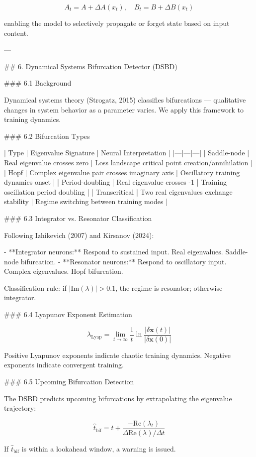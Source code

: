 \[
A_t = A + \Delta A(x_t), \quad B_t = B + \Delta B(x_t)
\]

enabling the model to selectively propagate or forget state based on input content.

---

## 6. Dynamical Systems Bifurcation Detector (DSBD)

### 6.1 Background

Dynamical systems theory (Strogatz, 2015) classifies bifurcations --- qualitative changes in system behavior as a parameter varies. We apply this framework to training dynamics.

### 6.2 Bifurcation Types

| Type | Eigenvalue Signature | Neural Interpretation |
|---|---|---|
| Saddle-node | Real eigenvalue crosses zero | Loss landscape critical point creation/annihilation |
| Hopf | Complex eigenvalue pair crosses imaginary axis | Oscillatory training dynamics onset |
| Period-doubling | Real eigenvalue crosses -1 | Training oscillation period doubling |
| Transcritical | Two real eigenvalues exchange stability | Regime switching between training modes |

### 6.3 Integrator vs. Resonator Classification

Following Izhikevich (2007) and Kirsanov (2024):

- **Integrator neurons:** Respond to sustained input. Real eigenvalues. Saddle-node bifurcation.
- **Resonator neurons:** Respond to oscillatory input. Complex eigenvalues. Hopf bifurcation.

Classification rule: if \( |\text{Im}(\lambda)| > 0.1 \), the regime is resonator; otherwise integrator.

### 6.4 Lyapunov Exponent Estimation

\[
\lambda_{\text{Lyap}} = \lim_{t \to \infty} \frac{1}{t} \ln \frac{|\delta \mathbf{x}(t)|}{|\delta \mathbf{x}(0)|}
\]

Positive Lyapunov exponents indicate chaotic training dynamics. Negative exponents indicate convergent training.

### 6.5 Upcoming Bifurcation Detection

The DSBD predicts upcoming bifurcations by extrapolating the eigenvalue trajectory:

\[
\hat{t}_{\text{bif}} = t + \frac{-\text{Re}(\lambda_t)}{\Delta \text{Re}(\lambda) / \Delta t}
\]

If \( \hat{t}_{\text{bif}} \) is within a lookahead window, a warning is issued.

